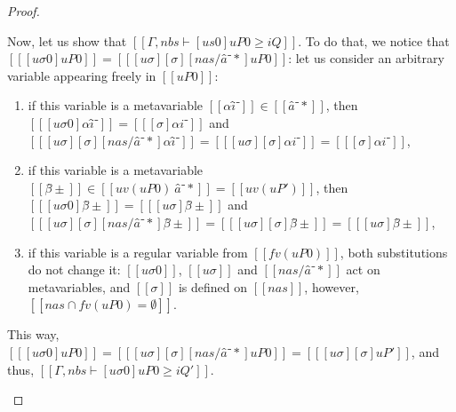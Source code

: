 \begin{proof}
\begin{caseof}
            Now, let us show that $[[Γ, nbs ⊢ [us0]uP0 ≥ iQ]]$.
            To do that, we notice that $[[ [uσ0]uP0 ]] = [[ [uσ][σ][nas/â⁻*]uP0 ]]$:
            let us consider an arbitrary variable appearing freely in $[[uP0]]$:
            \begin{enumerate}
                \item if this variable is a metavariable $[[αî⁻]] \in [[â⁻*]]$, then
                $[[ [uσ0]αî⁻ ]] = [[ [σ]αi⁻ ]]$ and 
                $[[ [uσ][σ][nas/â⁻*]αî⁻ ]] = [[ [uσ][σ]αi⁻ ]] = [[ [σ]αi⁻ ]]$,
                \item if this variable is a metavariable $[[β̂±]] \in [[ uv(uP0) \ {â⁻*} ]] = [[uv(uP')]]$, then
                $[[ [uσ0]β̂± ]] = [[ [uσ]β̂± ]]$ and $[[ [uσ][σ][nas/â⁻*]β̂± ]] = [[ [uσ][σ]β̂± ]] = [[ [uσ]β̂± ]]$,
                \item if this variable is a regular variable from $[[fv(uP0)]]$, both substitutions do not change it:
                $[[ uσ0 ]]$, $[[ uσ ]]$ and $[[ nas / â⁻* ]]$ act on metavariables, 
                and $[[σ]]$ is defined on $[[nas]]$, however, $[[{nas} ∩ fv(uP0) = ∅]]$.
            \end{enumerate}
            This way, $[[ [uσ0]uP0 ]] = [[ [uσ][σ][nas/â⁻*]uP0 ]] = [[ [uσ][σ]uP' ]]$,
            and thus, $[[ Γ, nbs ⊢ [uσ0]uP0 ≥ iQ' ]]$.
    \end{caseof}
\end{proof}
